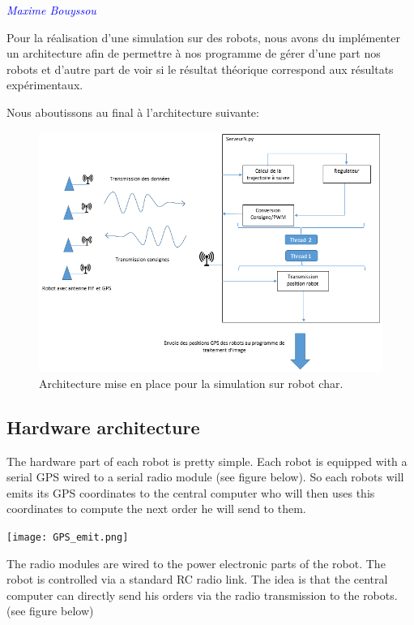 \textcolor{blue}{\textit{Maxime Bouyssou}}

Pour la réalisation d'une simulation sur des robots, nous avons du implémenter un architecture afin de permettre à nos programme de gérer d'une part nos robots et d'autre part de voir si le résultat théorique correspond aux résultats expérimentaux.

\medskip

Nous aboutissons au final à l'architecture suivante:

\bigskip

\begin{figure}[ht]
\centering
    \includegraphics[scale=0.8,angle=0]{SyntheseExp.PNG}
    \caption{Architecture mise en place pour la simulation sur robot char.}
    \label{fig:SyntheseExp}
\end{figure}

\bigskip
\subsection{Hardware architecture}
The hardware part of each robot is pretty simple. Each robot is equipped with a serial GPS wired to a serial radio module (see figure below). So each robots will emits its GPS coordinates to the central computer who will then uses this coordinates to compute the next order he will send to them.

\begin{center}
\texttt{[image: GPS\_emit.png]} 
\label{fig1}
\end{center}

The radio modules are wired to the power electronic parts of the robot. The robot is controlled via a standard RC radio link. The idea is that the central computer can directly send his orders via the radio transmission to the robots. (see figure below)

